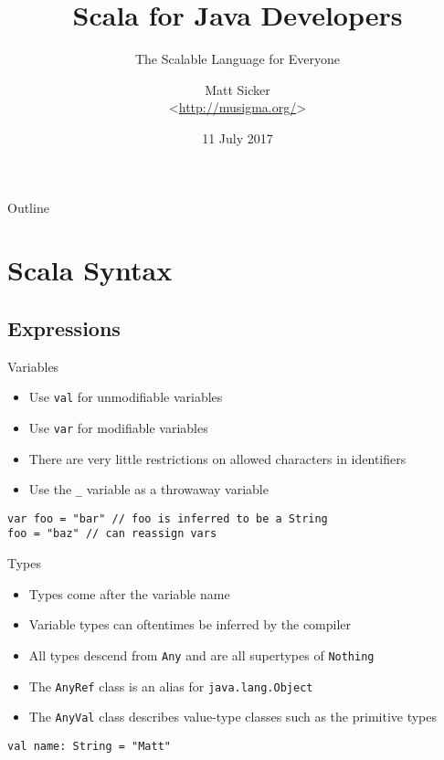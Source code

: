 \documentclass{beamer}
\title{Scala for Java Developers}
\subtitle{The Scalable Language for Everyone}
\author[Matt Sicker @jvz]{Matt Sicker \\ <\url{http://musigma.org/}>}
\institute{SPR Consulting}
\date{11 July 2017}
\begin{document}
\lstset{language=Scala}

\begin{frame}
  \titlepage
\end{frame}

\begin{frame}{Outline}
  \tableofcontents
\end{frame}

\section{Scala Syntax}

\subsection{Expressions}

\begin{frame}[fragile]{Variables}
\begin{itemize}
\item Use \lstinline{val} for unmodifiable variables
\item Use \lstinline{var} for modifiable variables
\item There are very little restrictions on allowed characters in identifiers
\item Use the \lstinline{_} variable as a throwaway variable
\end{itemize}
\begin{lstlisting}
var foo = "bar" // foo is inferred to be a String
foo = "baz" // can reassign vars
\end{lstlisting}
\end{frame}

\begin{frame}[fragile]{Types}
\begin{itemize}
\item Types come after the variable name
\item Variable types can oftentimes be inferred by the compiler
\item All types descend from \lstinline{Any} and are all supertypes of \lstinline{Nothing}
\item The \lstinline{AnyRef} class is an alias for \lstinline{java.lang.Object}
\item The \lstinline{AnyVal} class describes value-type classes such as the primitive types
\end{itemize}
\begin{lstlisting}
val name: String = "Matt"
\end{lstlisting}
\end{frame}
\end{document}
